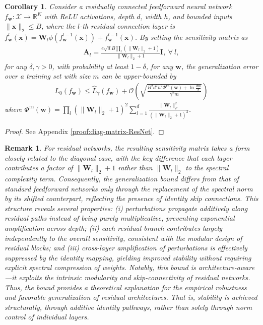 \documentclass[journal]{IEEEtran} %
\newtheorem{remark}{Remark}%
\newtheorem{corollary}{Corollary}%
\def\vw{{\bm{w}}}
\def\vx{{\bm{x}}}
\def\mA{{\bm{A}}}
\def\mI{{\bm{I}}}
\def\mW{{\bm{W}}}
\def\gO{{\mathcal{O}}}
\def\gX{{\mathcal{X}}}
\newcommand{\R}{\mathbb{R}}
\newcommand{\Norm}[1]{\|#1\|}
\begin{document}
\begin{corollary}\label{cor:diag-matrix-ResNet}
    Consider a residually connected feedforward neural network $f_{\vw}: \gX \to \R^K$ with ReLU activations, depth $d$, width $h$, and bounded inputs $\Norm{\vx}_2 \le B$, where the $l$-th residual connection layer is $f_{\vw}^l(\vx) = \mW_l \phi(f_{\vw}^{l-1}(\vx)) + f_{\vw}^{l-1}(\vx)$.
    By setting the sensitivity matrix as
    \begin{align} \label{eq:diagonal-Al-residual}
        \mA_l =  \frac{ e\sqrt{d}B \prod_l (\Norm{\mW_l}_2+1)}{\Norm{\mW_l}_2+1} \mI, \ \forall~l,
    \end{align}
    for any $\delta,\gamma>0$, with probability at least $1-\delta$, for any $\vw$, the generalization error over a training set with size $m$ can be upper-bounded by
    \begin{align}
    L_0(f_{\vw}) \le \hat{L}_{\gamma}(f_{\vw}) + \gO \left( \sqrt{ \frac{ B^2 d^2h^2\Phi^{\mathrm{rn}}(\vw) + \ln \frac{dm}{\delta}}{\gamma^2m}} \right)
    \end{align}
    where $\Phi^{\mathrm{rn}}(\vw)=\prod_l (\Norm{\mW_l}_2+1)^2  \sum_{l=1}^d \frac{\Norm{\mW_l}_F^2}{(\Norm{\mW_l}_2+1)^2}$.
\end{corollary}

\begin{proof}
See Appendix \ref{proof:diag-matrix-ResNet}.
\end{proof}
\begin{remark}\upshape
    For residual networks, the resulting sensitivity matrix takes a form closely related to the diagonal case, with the key difference that each layer contributes a factor of $\Norm{\mW_l}_2+1$ rather than $\Norm{\mW_l}_2$ to the spectral complexity term. Consequently, the generalization bound differs from that of standard feedforward networks only through the replacement of the spectral norm by its shifted counterpart, reflecting the presence of identity skip connections. This structure reveals several properties: (i) perturbations propagate additively along residual paths instead of being purely multiplicative, preventing exponential amplification across depth; (ii) each residual branch contributes largely independently to the overall sensitivity, consistent with the modular design of residual blocks; and (iii) cross-layer amplification of perturbations is effectively suppressed by the identity mapping, yielding improved stability without requiring explicit spectral compression of weights. Notably, this bound is architecture-aware---it exploits the intrinsic modularity and skip-connectivity of residual networks. Thus, the bound provides a theoretical explanation for the empirical robustness and favorable generalization of residual architectures. That is, stability is achieved structurally, through additive identity pathways, rather than solely through norm control of individual layers.
\end{remark}
\end{document}
